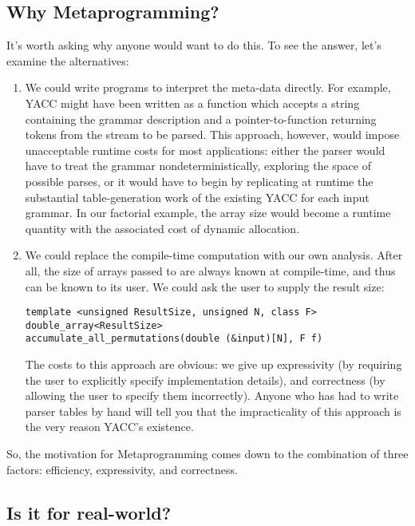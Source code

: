 \documentclass{netobjectdays}
\begin{document}
\subsection{Why Metaprogramming?}

It's worth asking why anyone would want to do this. To see the answer,
let's examine the alternatives:

\begin{enumerate}

\item We could write programs to interpret the meta-data directly. For
  example, YACC might have been written as a function which accepts a
  string containing the grammar description and a pointer-to-function
  returning tokens from the stream to be parsed. This approach,
  however, would impose unacceptable runtime costs for most
  applications: either the parser would have to treat the grammar
  nondeterministically, exploring the space of possible parses, or it
  would have to begin by replicating at runtime the substantial
  table-generation work of the existing YACC for each input
  grammar. In our factorial example, the array size would become a
  runtime quantity with the associated cost of dynamic allocation.

\item We could replace the compile-time computation with our own
  analysis. After all, the size of arrays passed to
   are always known at
  compile-time, and thus can be known to its user. We could ask the
  user to supply the result size:
  {\footnotesize
  \begin{verbatim}
template <unsigned ResultSize, unsigned N, class F>
double_array<ResultSize>
accumulate_all_permutations(double (&input)[N], F f)
  \end{verbatim}
  }
  The costs to this approach are obvious: we give up expressivity (by
  requiring the user to explicitly specify implementation details),
  and correctness (by allowing the user to specify them
  incorrectly). Anyone who has had to write parser tables by hand will
  tell you that the impracticality of this approach is the very reason
  YACC's existence.
\end{enumerate}

So, the motivation for Metaprogramming comes down to the combination
of three factors: efficiency, expressivity, and correctness.

\subsection{Is it for real-world? }
\end{document}

